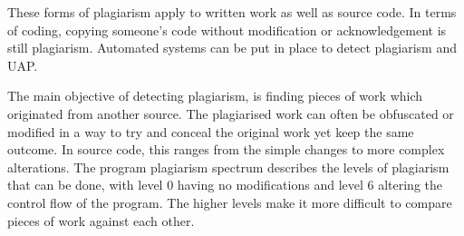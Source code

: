 These forms of plagiarism apply to written work as well as source code. In terms of coding, copying someone's code without modification or acknowledgement is still plagiarism. Automated systems can be put in place to detect plagiarism and UAP.

The main objective of detecting plagiarism, is finding pieces of work which originated from another source. The plagiarised work can often be obfuscated or modified in a way to try and conceal the original work yet keep the same outcome. In source code, this ranges from the simple changes to more complex alterations. The program plagiarism spectrum describes the levels of plagiarism that can be done, with level 0 having no modifications and level 6 altering the control flow of the program\cite{Parker1989}. The higher levels make it more difficult to compare pieces of work against each other.
